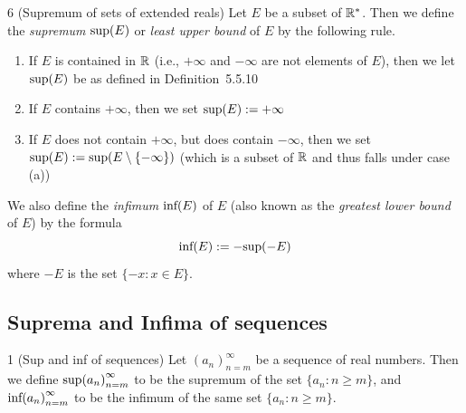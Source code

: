 \begin{definition}{6}
    \label{extended-supremum}
    (Supremum of sets of extended reals) Let $E$ be a subset of $\mathbb{R}^*$.
    Then we define the \emph{supremum} $\text{sup}{(E)}$ or \emph{least upper bound}
    of $E$ by the following rule.
    \begin{enumerate}
        \item If $E$ is contained in $\mathbb{R}$ (i.e., $+\infty$ and $-\infty$ are not
        elements of $E$), then we let $\text{sup}{(E)}$ be as defined in Definition~5.5.10
        \item If $E$ contains $+\infty$, then we set $\text{sup}{(E)} := +\infty$
        \item If $E$ does not contain $+\infty$, but does contain $-\infty$, then we
        set $\text{sup}{(E)} := \text{sup}{(E \setminus \{-\infty\})}$ (which is a subset of $\mathbb{R}$
        and thus falls under case (a))
    \end{enumerate}
    We also define the \emph{infimum} $\text{inf}{(E)}$ of $E$ (also known as the \emph{greatest
    lower bound} of $E$) by the formula
    \begin{equation*}
        \text{inf}{(E)} := -\text{sup}{(-E)}
    \end{equation*}
    where $-E$ is the set $\{-x: x \in E\}$.
\end{definition}

        
\subsection{Suprema and Infima of sequences}
\begin{definition}{1}
    \label{sequence-sup-inf}
    (Sup and inf of sequences) Let $(a_n)_{n=m}^{\infty}$ be a sequence of real
    numbers. Then we define $\text{sup}{(a_n)}_{n=m}^{\infty}$ to be the supremum of the set
    $\{a_n: n \geq m\}$, and $\text{inf}{(a_n)}_{n=m}^{\infty}$ to be the infimum of the same set
    $\{a_n: n \geq m\}$.
\end{definition}


